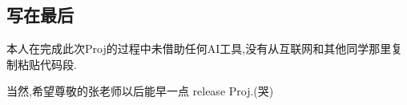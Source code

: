 \documentclass{article}
\begin{document}
\begin{CJK*}{UTF8}{gbsn}
\section{写在最后}
\par 本人在完成此次Proj的过程中未借助任何AI工具,没有从互联网和其他同学那里复制粘贴代码段.
\par 当然,希望尊敬的张老师以后能早一点 release Proj.(哭)

\end{CJK*}
\end{document}
